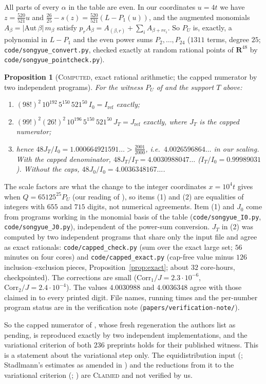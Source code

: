 \documentclass[11pt]{amsart}
\newtheorem{proposition}[theorem]{Proposition}
\theoremstyle{definition}
\theoremstyle{remark}
\newcommand{\lbl}[1]{\textup{\textsc{#1}}}
\begin{document}
All parts of every $\alpha$ in the table are even. In our coordinates $u=4t$
we have $z=\frac{520}{521}u$ and
$\frac{26}{25}-s(z)=\frac{520}{521}(L-P_1(u))$, and the augmented monomials
$A_\beta=|\mathrm{Aut}\,\beta|\,m_\beta$ satisfy
$p_rA_\beta=A_{(\beta,r)}+\sum_iA_{\beta+r e_i}$. So $P_U$ is, exactly, a
polynomial in $L-P_1$ and the even power sums $P_2,\dots,P_{24}$ ($1311$
terms, degree $25$; \texttt{code/songyue\_convert.py}, checked exactly at
random rational points of $\mathbf{R}^{48}$ by \texttt{code/songyue\_pointcheck.py}).

\begin{proposition}[\lbl{Computed}, exact rational arithmetic; the capped numerator by two independent programs]\label{prop:sy-exact}
For the witness $P_U$ of \cite{SY26} and the support $T$ above:
\begin{enumerate}
\item $(98!)^2\,10^{192}\,5^{150}\,521^{50}\,I_0=I_{\mathrm{ref}}$ exactly;
\item $(99!)^2(26!)^2\,10^{196}\,5^{150}\,521^{50}\,J_T=J_{\mathrm{ref}}$ exactly,
where $J_T$ is the capped numerator;
\item hence $48J_T/I_0=1.000664921591\ldots>\frac{2001}{2000}$, i.e.\
$4.0026596864\ldots$ in our scaling. With the capped denominator,
$48J_T/I_T=4.0030988047\ldots$ ($I_T/I_0=0.99989031$). Without the caps,
$48J_0/I_0=4.0036348167\ldots$.
\end{enumerate}
\end{proposition}
\begin{sloppypar}
The scale factors are what the change to the integer coordinates $x=10^4t$
gives when $Q=65125^{25}P_U$ (our reading of \cite[Eq.~(71)]{SY26}), so items
(1) and (2) are equalities of integers with $655$ and $715$ digits, not
numerical agreements. Item (1) and $J_0$ come from programs working in the
monomial basis of the table (\texttt{code/songyue\_I0.py},
\texttt{code/songyue\_J0.py}), independent of the power-sum conversion. $J_T$
in (2) was computed by two independent programs that share only the input
file and agree as exact rationals: \texttt{code/capped\_check.py} (sum over the
exact large set; $56$ minutes on four cores) and \texttt{code/capped\_exact.py}
(cap-free value minus $126$ inclusion--exclusion pieces,
Proposition~\ref{prop:exact}; about $32$ core-hours, checkpointed). The
corrections are small ($\mathrm{Corr}_1/J=2.3\cdot10^{-6}$,
$\mathrm{Corr}_2/J=2.4\cdot10^{-4}$). The values $4.0030988$ and $4.0036348$
agree with those claimed in \cite{Kin26} to every printed digit. File names,
running times and the per-number program status are in the verification note
(\texttt{papers/verification-note/}).
\end{sloppypar}
So the capped numerator of \cite{SY26}, whose fresh regeneration the authors
list as pending, is reproduced exactly by two independent implementations, and
the variational criterion of both $236$ preprints holds for their published
witness. This is a statement about the variational step only. The
equidistribution input (\cite[Theorem~4.18]{SY26}; Stadlmann's estimates as
amended in \cite{Kin26}) and the reductions from it to the variational
criterion (\cite[Thm.~4.33, \S\S4.12--4.14]{SY26}; \cite[Prop.~1]{Sta26})
are \lbl{Claimed} and not verified by us.
\end{document}
